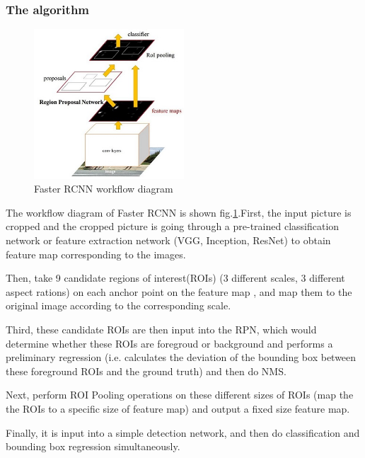 \subsubsection{The algorithm}
\begin{figure}[h!]
    \centering
    \includegraphics[width=0.5\textwidth]{Chapters/Fig/frrcnn.png}
    \caption{Faster \acrshort{RCNN} workflow diagram}
    \label{fig:frrcnn_workflow}
\end{figure}\par
The workflow diagram of Faster \acrshort{RCNN} is shown fig.\ref{fig:frrcnn_workflow}\cite{FrRCNN}.First, the input picture is cropped and the cropped picture is going through a pre-trained classification network or feature extraction network (VGG\cite{vgg}, Inception\cite{Szegedy_2015_CVPR}, ResNet\cite{He_2016_CVPR}) to obtain feature map corresponding to the images.\par
Then, take 9 candidate regions of interest(\acrshort{ROI}s) (3 different scales, 3 different aspect rations) on each anchor point on the feature map \cite{FrRCNN} , and map them to the original image according to the corresponding scale.\par
Third, these candidate \acrshort{ROI}s are then input into the \acrshort{RPN}, which would determine whether these \acrshort{ROI}s are foregroud or background and performs a preliminary regression (i.e. calculates the deviation of the bounding box between these foreground \acrshort{ROI}s and the ground truth) and then do \acrshort{NMS}\cite{SA}.\par
Next, perform ROI Pooling operations on these different sizes of \acrshort{ROI}s (map the the \acrshort{ROI}s to a specific size of feature map) and output a fixed size feature map.\par
Finally, it is input into a simple detection network, and then do classification and bounding box regression simultaneously.
